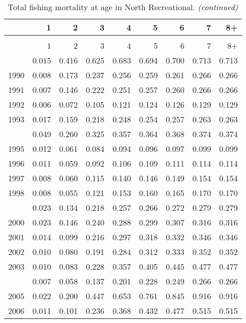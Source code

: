 \documentclass[
]{article}
\begin{document}
\begin{longtable}[t]{lrrrrrrrr}
\caption{\label{tab:North_Recreational-fleet-FAA-table}Total fishing mortality at age in North Recreational.}\\
\toprule
  & 1 & 2 & 3 & 4 & 5 & 6 & 7 & 8+\\
\midrule
\endfirsthead
\caption[]{Total fishing mortality at age in North Recreational. \textit{(continued)}}\\
\toprule
  & 1 & 2 & 3 & 4 & 5 & 6 & 7 & 8+\\
\midrule
\endhead

\endfoot
\bottomrule
\endlastfoot
1989 & 0.015 & 0.416 & 0.625 & 0.683 & 0.694 & 0.700 & 0.713 & 0.713\\
1990 & 0.008 & 0.173 & 0.237 & 0.256 & 0.259 & 0.261 & 0.266 & 0.266\\
1991 & 0.007 & 0.146 & 0.222 & 0.251 & 0.257 & 0.260 & 0.266 & 0.266\\
1992 & 0.006 & 0.072 & 0.105 & 0.121 & 0.124 & 0.126 & 0.129 & 0.129\\
1993 & 0.017 & 0.159 & 0.218 & 0.248 & 0.254 & 0.257 & 0.263 & 0.263\\
\addlinespace
1994 & 0.049 & 0.260 & 0.325 & 0.357 & 0.364 & 0.368 & 0.374 & 0.374\\
1995 & 0.012 & 0.061 & 0.084 & 0.094 & 0.096 & 0.097 & 0.099 & 0.099\\
1996 & 0.011 & 0.059 & 0.092 & 0.106 & 0.109 & 0.111 & 0.114 & 0.114\\
1997 & 0.008 & 0.060 & 0.115 & 0.140 & 0.146 & 0.149 & 0.154 & 0.154\\
1998 & 0.008 & 0.055 & 0.121 & 0.153 & 0.160 & 0.165 & 0.170 & 0.170\\
\addlinespace
1999 & 0.023 & 0.134 & 0.218 & 0.257 & 0.266 & 0.272 & 0.279 & 0.279\\
2000 & 0.023 & 0.146 & 0.240 & 0.288 & 0.299 & 0.307 & 0.316 & 0.316\\
2001 & 0.014 & 0.099 & 0.216 & 0.297 & 0.318 & 0.332 & 0.346 & 0.346\\
2002 & 0.010 & 0.080 & 0.191 & 0.284 & 0.312 & 0.333 & 0.352 & 0.352\\
2003 & 0.010 & 0.083 & 0.228 & 0.357 & 0.405 & 0.445 & 0.477 & 0.477\\
\addlinespace
2004 & 0.007 & 0.058 & 0.137 & 0.201 & 0.228 & 0.249 & 0.266 & 0.266\\
2005 & 0.022 & 0.200 & 0.447 & 0.653 & 0.761 & 0.845 & 0.916 & 0.916\\
2006 & 0.011 & 0.101 & 0.236 & 0.368 & 0.432 & 0.477 & 0.515 & 0.515\\

\end{longtable}
\end{document}
